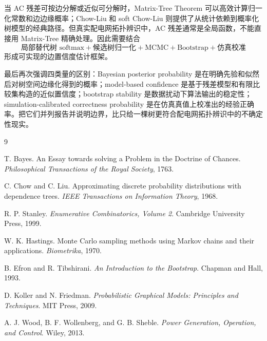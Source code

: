 \documentclass[UTF8,12pt,openany]{ctexrep}
\numberwithin{equation}{chapter}
\theoremstyle{definition}
\theoremstyle{plain}
\begin{document}
当 AC 残差可按边分解或近似可分解时，Matrix-Tree Theorem 可以高效计算归一化常数和边边缘概率；Chow-Liu 和 soft Chow-Liu 则提供了从统计依赖到概率化树模型的经典路径。但真实配电网拓扑辨识中，AC 残差通常是全局函数，不能直接用 Matrix-Tree 精确处理。因此需要结合
\begin{equation}
\text{局部替代树 softmax}
+
\text{候选树归一化}
+
\text{MCMC}
+
\text{Bootstrap}
+
\text{仿真校准}
\label{eq:summary-methods}
\end{equation}
形成可实现的边置信度估计框架。

最后再次强调四类量的区别：Bayesian posterior probability 是在明确先验和似然后对树空间边缘化得到的概率；model-based confidence 是基于残差模型和有限比较集构造的近似置信度；bootstrap stability 是数据扰动下算法输出的稳定性；simulation-calibrated correctness probability 是在仿真真值上校准出的经验正确率。把它们并列报告并说明边界，比只给一棵树更符合配电网拓扑辨识中的不确定性现实。

\begin{thebibliography}{9}

T. Bayes.
\newblock An Essay towards solving a Problem in the Doctrine of Chances.
\newblock \emph{Philosophical Transactions of the Royal Society}, 1763.

C. Chow and C. Liu.
\newblock Approximating discrete probability distributions with dependence trees.
\newblock \emph{IEEE Transactions on Information Theory}, 1968.

R. P. Stanley.
\newblock \emph{Enumerative Combinatorics, Volume 2}.
\newblock Cambridge University Press, 1999.

W. K. Hastings.
\newblock Monte Carlo sampling methods using Markov chains and their applications.
\newblock \emph{Biometrika}, 1970.

B. Efron and R. Tibshirani.
\newblock \emph{An Introduction to the Bootstrap}.
\newblock Chapman and Hall, 1993.

D. Koller and N. Friedman.
\newblock \emph{Probabilistic Graphical Models: Principles and Techniques}.
\newblock MIT Press, 2009.

A. J. Wood, B. F. Wollenberg, and G. B. Sheble.
\newblock \emph{Power Generation, Operation, and Control}.
\newblock Wiley, 2013.

\end{thebibliography}
\end{document}
